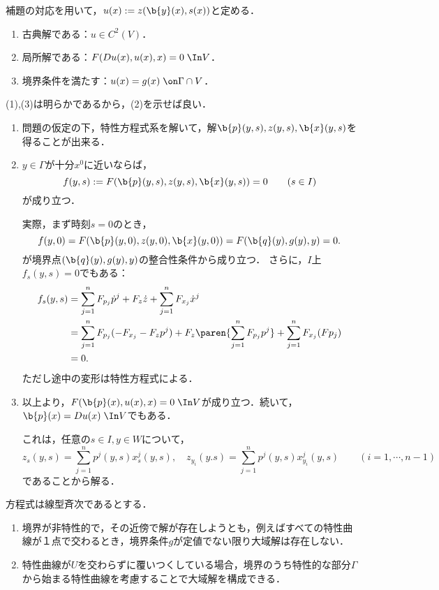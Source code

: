 \documentclass[uplatex,dvipdfmx]{jsreport}
\begin{document}
\begin{theorem}\label{thm-Local-Existence-Theorem}
    補題の対応を用いて，$u(x):=z(\b{y}(x),s(x))$と定める．
    \begin{enumerate}
        \item 古典解である：$u\in C^2(V)$．
        \item 局所解である：$F(Du(x),u(x),x)=0\;\In V$．
        \item 境界条件を満たす：$u(x)=g(x)\;\on\Gamma\cap V$．
    \end{enumerate}
\end{theorem}
\begin{Proof}
    (1),(3)は明らかであるから，(2)を示せば良い．
    \begin{enumerate}[{Step}1]
        \item 問題の仮定の下，特性方程式系を解いて，解$\b{p}(y,s),z(y,s),\b{x}(y,s)$を得ることが出来る．
        \item $y\in\Gamma$が十分$x^0$に近いならば，
        \[f(y,s):=F(\b{p}(y,s),z(y,s),\b{x}(y,s))=0\qquad(s\in I)\]
        が成り立つ．

        実際，まず時刻$s=0$のとき，
        \[f(y,0)=F(\b{p}(y,0),z(y,0),\b{x}(y,0))=F(\b{q}(y),g(y),y)=0.\]
        が境界点$(\b{q}(y),g(y),y)$の整合性条件から成り立つ．
        さらに，$I$上$f_s(y,s)=0$でもある：
        \begin{align*}
            f_s(y,s)&=\sum_{j=1}^nF_{p_j}\dot{p}^j+F_z\dot{z}+\sum_{j=1}^nF_{x_j}\dot{x}^j\\
            &=\sum_{j=1}^nF_{p_j}(-F_{x_j}-F_zp^j)+F_z\paren{\sum_{j=1}^nF_{p_j}p^j}+\sum_{j=1}^nF_{x_j}(Fp_j)\\
            &=0.
        \end{align*}
        ただし途中の変形は特性方程式による．
        \item 以上より，$F(\b{p}(x),u(x),x)=0\;\In V$が成り立つ．続いて，$\b{p}(x)=Du(x)\;\In V$でもある．
        
        これは，任意の$s\in I,y\in W$について，
        \[z_s(y,s)=\sum_{j=1}^np^j(y,s)x_s^j(y,s),\quad z_{y_i}(y.s)=\sum_{j=1}^np^j(y,s)x^j_{y_i}(y,s)\qquad(i=1,\cdots,n-1)\]
        であることから解る．
    \end{enumerate}
\end{Proof}

\begin{example}
    方程式は線型斉次であるとする．
    \begin{enumerate}
        \item 境界が非特性的で，その近傍で解が存在しようとも，例えばすべての特性曲線が１点で交わるとき，境界条件$g$が定値でない限り大域解は存在しない．
        \item 特性曲線が$U$を交わらずに覆いつくしている場合，境界のうち特性的な部分$\Gamma$から始まる特性曲線を考慮することで大域解を構成できる．
    \end{enumerate}
\end{example}
\end{document}
